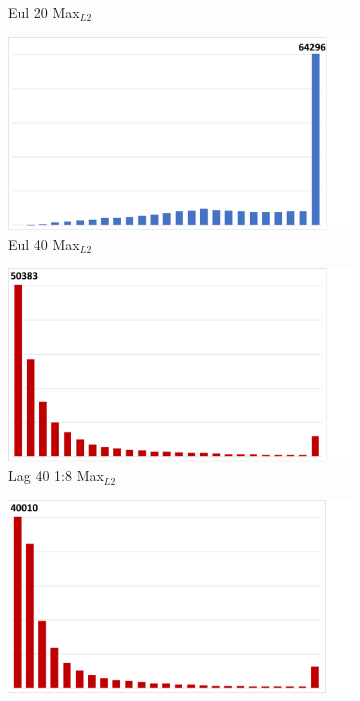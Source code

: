 \begin{figure}
\begin{subfigure}{0.195\textwidth}
\vspace{-2mm}
\caption{Eul 20 Max$_{L2}$ }
\end{subfigure}
\begin{subfigure}{0.195\textwidth}
\centering
\includegraphics[width=0.95\linewidth]{results/cloverleaf3d/eul_2/Eul2_Max.pdf}
\vspace{-2mm}
\caption{Eul 40 Max$_{L2}$ }
\end{subfigure}
\hspace{0.2mm}
\begin{subfigure}{0.195\textwidth}
\centering
\includegraphics[width=0.9\linewidth, trim={0cm 0cm 2.5cm 0cm}, clip]{results/cloverleaf3d/lag_4/Lag4_Max.pdf}
\vspace{-2mm}
\caption{Lag 40 1:8 Max$_{L2}$ }
\end{subfigure}
\begin{subfigure}{0.195\textwidth}
\centering
\includegraphics[width=0.9\linewidth, trim={0cm 0cm 2.5cm 0cm}, clip]{results/cloverleaf3d/lag_5/Lag5_Max.pdf}

\end{subfigure}
\end{figure}
